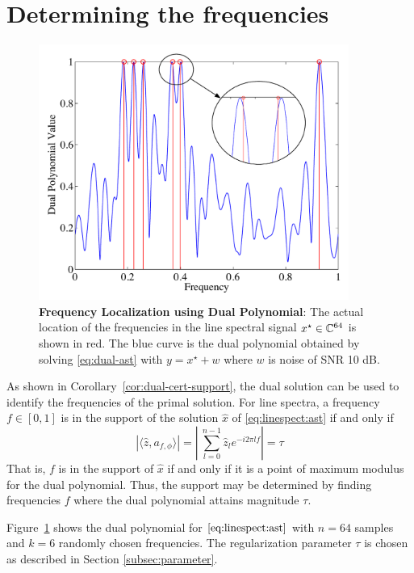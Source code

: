 \section{Determining the frequencies}
\label{sec:frequency-localize}
\begin{figure}[htp]
\centering
\includegraphics[width=4in]{figures/dual_poly_inset.pdf}
\caption{ \textbf{Frequency Localization using Dual Polynomial}: The
actual location of the frequencies in the line spectral signal $x^\star \in
\mathbb{C}^{64}$ is shown in red. The blue curve is the dual polynomial
obtained by solving \eqref{eq:dual-ast} with $y = x^\star + w$ where $w$ is noise of SNR 10 dB.}

\label{fig:dual_poly_localize}
\end{figure}

As shown in Corollary~\ref{cor:dual-cert-support}, the dual solution can be
used to identify the frequencies of the primal solution. For line spectra, a frequency
$f \in [0,1]$ is in the support of the solution $\hat{x}$ of \eqref{eq:linespect:ast} if and
only if
\[
	 |\langle \hat{z}, a_{f,\phi} \rangle| =\left|\ \sum_{l=0}^{n-1} \hat{z}_l e^{-i 2\pi l f} \right| = \tau
\]
That is, $f$ is in the support of $\hat{x}$ if and only if it is a point of
maximum modulus for the dual polynomial. Thus, the support may be determined by
finding frequencies $f$ where the dual polynomial attains magnitude $\tau$.

Figure~\ref{fig:dual_poly_localize} shows the dual polynomial for
$\eqref{eq:linespect:ast}$ with $n = 64$ samples and $k = 6$ randomly chosen
frequencies. The regularization parameter $\tau$ is chosen as described in
Section \ref{subsec:parameter}.

